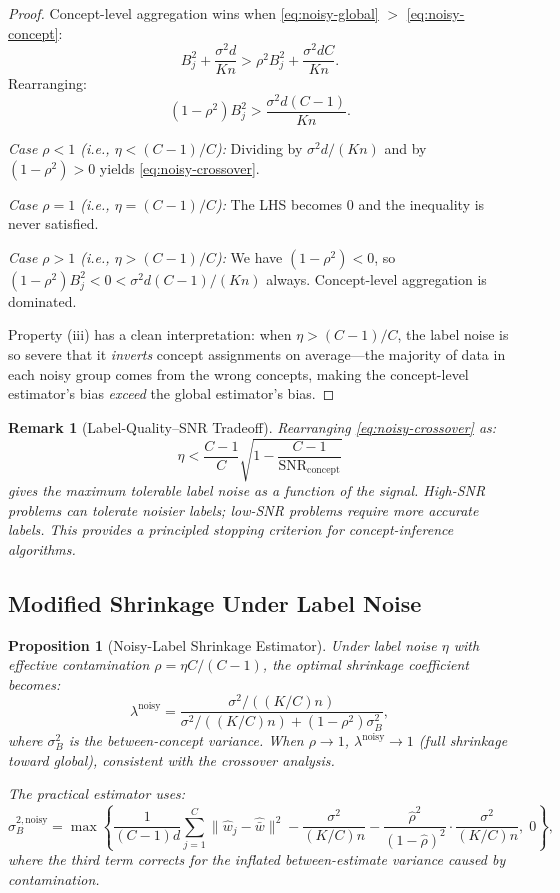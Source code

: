\documentclass[11pt,a4paper]{article}
\newtheorem{proposition}[theorem]{Proposition}
\newtheorem{remark}[theorem]{Remark}
\newcommand{\SNR}{\mathrm{SNR}}
\newcommand{\what}{\hat{w}}
\begin{document}
\begin{proof}
Concept-level aggregation wins when \eqref{eq:noisy-global} $>$ \eqref{eq:noisy-concept}:
\[
B_j^2 + \frac{\sigma^2 d}{Kn} > \rho^2 B_j^2 + \frac{\sigma^2 dC}{Kn}.
\]
Rearranging:
\[
(1 - \rho^2) B_j^2 > \frac{\sigma^2 d(C - 1)}{Kn}.
\]

\emph{Case $\rho < 1$ (i.e., $\eta < (C-1)/C$):} Dividing by $\sigma^2 d / (Kn)$ and by $(1 - \rho^2) > 0$ yields \eqref{eq:noisy-crossover}.

\emph{Case $\rho = 1$ (i.e., $\eta = (C-1)/C$):} The LHS becomes 0 and the inequality is never satisfied.

\emph{Case $\rho > 1$ (i.e., $\eta > (C-1)/C$):} We have $(1 - \rho^2) < 0$, so $(1-\rho^2)B_j^2 < 0 < \sigma^2 d(C-1)/(Kn)$ always. Concept-level aggregation is dominated.

Property (iii) has a clean interpretation: when $\eta > (C-1)/C$, the label noise is so severe that it \emph{inverts} concept assignments on average---the majority of data in each noisy group comes from the wrong concepts, making the concept-level estimator's bias \emph{exceed} the global estimator's bias.
\end{proof}

\begin{remark}[Label-Quality--SNR Tradeoff]
Rearranging \eqref{eq:noisy-crossover} as:
\[
\eta < \frac{C-1}{C}\sqrt{1 - \frac{C-1}{\SNR_{\mathrm{concept}}}}
\]
gives the maximum tolerable label noise as a function of the signal. High-SNR problems can tolerate noisier labels; low-SNR problems require more accurate labels. This provides a principled stopping criterion for concept-inference algorithms.
\end{remark}

\subsection{Modified Shrinkage Under Label Noise}

\begin{proposition}[Noisy-Label Shrinkage Estimator]\label{prop:noisy-shrink}
Under label noise $\eta$ with effective contamination $\rho = \eta C/(C-1)$, the optimal shrinkage coefficient becomes:
\begin{equation}
\lambda^{\mathrm{noisy}} = \frac{\sigma^2 / ((K/C)n)}{\sigma^2 / ((K/C)n) + (1 - \rho^2)\sigma_B^2},
\end{equation}
where $\sigma_B^2$ is the between-concept variance. When $\rho \to 1$, $\lambda^{\mathrm{noisy}} \to 1$ (full shrinkage toward global), consistent with the crossover analysis.

The practical estimator uses:
\begin{equation}
\hat{\sigma}_B^{2,\mathrm{noisy}} = \max\left\{\frac{1}{(C-1)d}\sum_{j=1}^C \|\what_j - \hat{\bar{w}}\|^2 - \frac{\sigma^2}{(K/C)n} - \frac{\hat{\rho}^2}{(1-\hat{\rho})^2} \cdot \frac{\sigma^2}{(K/C)n},\; 0\right\},
\end{equation}
where the third term corrects for the inflated between-estimate variance caused by contamination.
\end{proposition}
\end{document}
